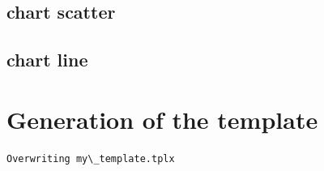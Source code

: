 \documentclass[reprint, floatfix, groupaddress, prb]{article}
\begin{document}
    \begin{figure}
        \begin{center}\end{center}
        \caption{}
        \label{}
    \end{figure}
    
    \hypertarget{chart-scatter}{%
\subsection{chart scatter}\label{chart-scatter}}

    \begin{figure}
        \begin{center}\end{center}
        \caption{}
        \label{}
    \end{figure}
    
    \hypertarget{chart-line}{%
\subsection{chart line}\label{chart-line}}

    \begin{figure}
        \begin{center}\end{center}
        \caption{}
        \label{}
    \end{figure}
    
    \hypertarget{generation-of-the-template}{%
\section{Generation of the template}\label{generation-of-the-template}}

    \begin{Verbatim}[commandchars=\\\{\}]
Overwriting my\_template.tplx
    \end{Verbatim}


    
    
    
\end{document}
